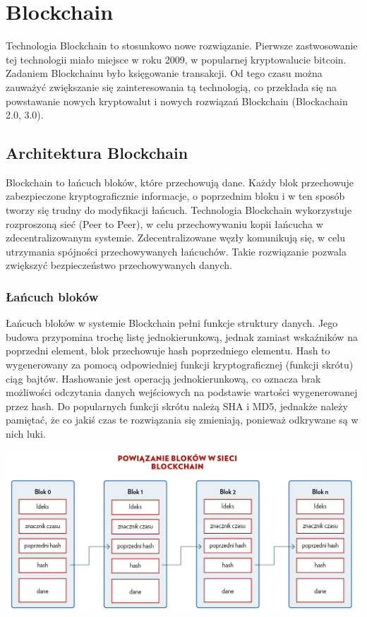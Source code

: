 \documentclass[a4paper,13pt]{report}
\begin{document}
\chapter{Blockchain}
Technologia Blockchain to stosunkowo nowe rozwiązanie. Pierwsze zastwosowanie tej technologii miało miejsce w roku 2009, w popularnej kryptowalucie bitcoin. Zadaniem Blockchainu było księgowanie transakcji. Od tego czasu można zauważyć zwiększanie się zainteresowania tą technologią, co przekłada się na powstawanie nowych kryptowalut i nowych rozwiązań Blockchain (Blockachain 2.0, 3.0).
\section{Architektura Blockchain}
Blockchain to łańcuch bloków, które przechowują dane. Każdy blok przechowuje zabezpieczone kryptograficznie informacje, o poprzednim bloku i w ten sposób tworzy się trudny do modyfikacji łańcuch. Technologia Blockchain wykorzystuje rozproszoną sieć (Peer to Peer), w celu przechowywaniu kopii łańcucha w zdecentralizowanym systemie. Zdecentralizowane węzły komunikują się, w celu utrzymania spójności przechowywanych łańcuchów. Takie rozwiązanie pozwala zwiększyć bezpieczeństwo przechowywanych danych.
\subsection{Łańcuch bloków}
Łańcuch bloków w systemie Blockchain pełni funkcje struktury danych. Jego budowa przypomina trochę listę jednokierunkową, jednak zamiast wskaźników na poprzedni element, blok przechowuje hash poprzedniego elementu. Hash to wygenerowany za pomocą odpowiedniej funkcji kryptograficznej (funkcji skrótu) ciąg bajtów. Hashowanie jest operacją jednokierunkową, co oznacza brak możliwości odczytania danych wejściowych na podstawie wartości wygenerowanej przez hash.
Do popularnych funkcji skrótu należą SHA i MD5, jednakże należy pamiętać, że co jakiś czas te rozwiązania się zmieniają, ponieważ odkrywane są w nich luki.

\includegraphics[width=\textwidth]{images/łańcuch_bloków.jpg}
\end{document}
